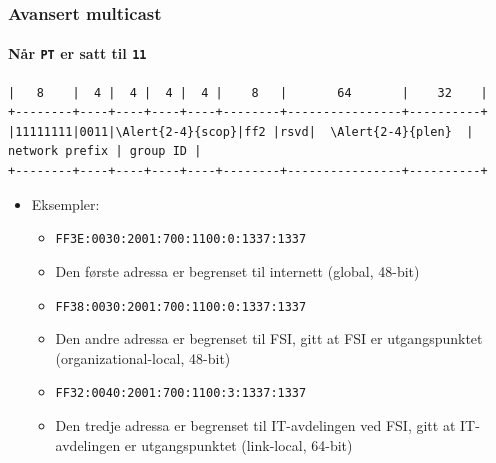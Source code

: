 \begin{frame}[fragile]
  \frametitle{Avansert multicast}
  \framesubtitle{Når \texttt{PT} er satt til \texttt{11}}
\begin{Verbatim}[commandchars=\\\{\},fontsize=\tiny]
|   8    |  4 |  4 |  4 |  4 |    8   |       64       |    32    |
+--------+----+----+----+----+--------+----------------+----------+
|11111111|0011|\Alert{2-4}{scop}|ff2 |rsvd|  \Alert{2-4}{plen}  | network prefix | group ID |
+--------+----+----+----+----+--------+----------------+----------+
\end{Verbatim}
  \begin{itemize}
  \item Eksempler:
    \begin{itemize}
    \item \texttt{FF3\alert<2>{E}:00\alert<2>{30}:2001:700:1100:0:1337:1337}
    \item Den første adressa er begrenset til internett (global,
      48-bit)
    \item \texttt{FF3\alert<3>{8}:00\alert<3>{30}:2001:700:1100:0:1337:1337}
    \item Den andre adressa er begrenset til FSI, gitt at FSI er
      utgangspunktet (organizational-local, 48-bit)
    \item \texttt{FF3\alert<4>{2}:00\alert<4>{40}:2001:700:1100:3:1337:1337}
    \item Den tredje adressa er begrenset til IT-avdelingen ved FSI,
      gitt at IT-avdelingen er utgangspunktet (link-local, 64-bit)
    \end{itemize}
  \end{itemize}
\end{frame}

